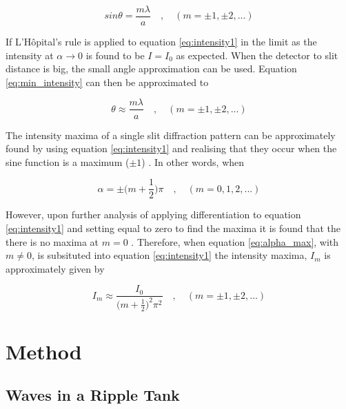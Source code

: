 \documentclass{article}
\begin{document}
\begin{equation}
\label{eq:min_intensity}
sin{\theta} = \frac{m \lambda}{a} \quad,\quad(m = \pm1, \pm2, ...)
\end{equation}

\vspace{2mm}
\noindent
If L'H{\^o}pital's rule \cite{Book01} is applied to equation \eqref{eq:intensity1} in the limit as the intensity at $\alpha \rightarrow 0$ is found to be $I = I_0$ as expected. When the detector to slit distance is big, the small angle approximation can be used. Equation \eqref{eq:min_intensity} can then be approximated to

\begin{equation}
\label{eq:small_angle}
\theta \approx \frac{m\lambda}{a} \quad,\quad(m = \pm1, \pm2, ...)
\end{equation}


\vspace{2mm}
\noindent
The intensity maxima of a single slit diffraction pattern can be approximately found by using equation \eqref{eq:intensity1} and realising that they occur when the sine function is a maximum ($\pm 1$) \cite{Book01}. In other words, when

\begin{equation}
\label{eq:alpha_max}
\alpha = \pm\bigg(m + \frac{1}{2}\bigg)\pi \quad,\quad(m = 0, 1, 2, ...)
\end{equation}

\vspace{2mm}
\noindent
However, upon further analysis of applying differentiation to equation \eqref{eq:intensity1} and setting equal to zero to find the maxima it is found that the there is no maxima at $m = 0$ \cite{Book01}. Therefore, when equation \eqref{eq:alpha_max}, with $m \neq 0$, is subsituted into equation \eqref{eq:intensity1} the intensity maxima, $I_m$ is approximately given by \cite{Book01}

\vspace{2mm}
\noindent
\begin{equation}
\label{eq:max_intensity}
I_m \approx \frac{I_0}{\big(m + \frac{1}{2}\big)^2\pi^2} \quad,\quad(m =  \pm1, \pm2, ...)
\end{equation}


\section{Method}
\label{sec:method}

\subsection{Waves in a Ripple Tank}
\label{ssec:ripple-method}
\end{document}
